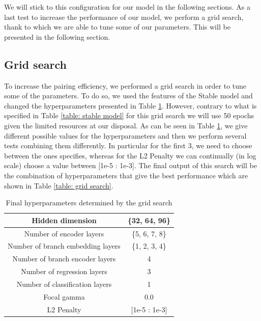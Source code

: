 We will stick to this configuration for our model in the following sections. As a last test to increase the performance of our model, we perform a grid search, thank to which we are able to tune some of our parameters. This will be presented in the following section.


\subsection{Grid search}
To increase the pairing efficiency, we performed a grid search in order to tune some of the parameters. 
To do so, we used the features of the Stable model and changed the hyperparameters presented in Table \ref{table: parameters for the grid search}. 
However, contrary to what is specified in Table \ref{table: stable model} for this grid search we will use 50 epochs given the limited resources at our disposal.
As can be seen in Table \ref{table: parameters for the grid search}, we give different possible values for the hyperparameters and then we perform several tests combining them differently.
In particular for the first 3, we need to choose between the ones specifies, whereas for the L2 Penalty we can continually (in log scale) choose a value between [1e-5 : 1e-3].
The final output of this search will be the combination of hyperparameters that give the best performance which are shown in Table \ref{table: grid search}.


\begin{table}[hbt]
   \centering
   \begin{tabular}{|c|c|}
    \hline
    Hidden dimension  &  \{32, 64, 96\}  \\
    \hline
   Number of encoder layers & \{5, 6, 7, 8\} \\
    \hline
    Number of branch embedding layers &  \{1, 2, 3, 4\}\\
    \hline
     Number of branch encoder layers & 4\\
    \hline
    Number of regression layers & 3 \\
    \hline
    Number of classification layers & 1 \\
    \hline
    Focal gamma & 0.0 \\
    \hline
    L2 Penalty & [1e-5 : 1e-3] \\
    \hline
   \end{tabular}
   \caption{Final hyperparameters determined by the grid search}
   \label{table: parameters for the grid search}
   \end{table}



